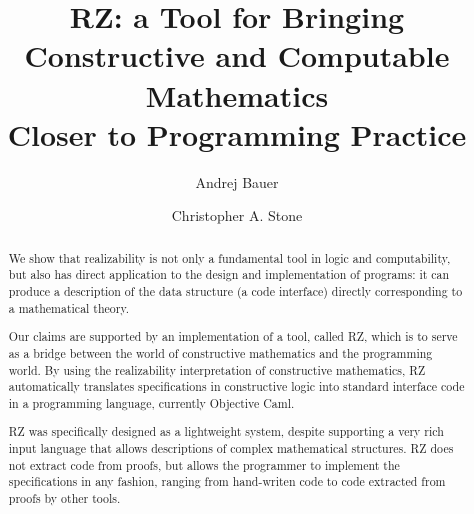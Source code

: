 \documentclass{llncs}
\begin{document}
\title{RZ: a Tool for Bringing\\
  Constructive and Computable Mathematics\\
  Closer to Programming Practice}
\author{
  Andrej Bauer \and
  Christopher A. Stone}

\maketitle

\begin{abstract}
  We show that realizability is not only a fundamental tool in logic
  and computability, but also has direct application to the design and
  implementation of programs: it can produce a description of the data
  structure (a code interface) directly corresponding to a
  mathematical theory.

  Our claims are supported by an implementation of a tool, called RZ,
  which is to serve as a bridge between the world of constructive
  mathematics and the programming world. By using the realizability
  interpretation of constructive mathematics, RZ automatically
  translates specifications in constructive logic into standard
  interface code in a programming language, currently Objective Caml.

  RZ was specifically designed as a lightweight system, despite
  supporting a very rich input language that allows descriptions of
  complex mathematical structures. RZ does not extract code from
  proofs, but allows the programmer to implement the specifications in
  any fashion, ranging from hand-writen code to code extracted from
  proofs by other tools.
\end{abstract}













\appendix


\end{document}
